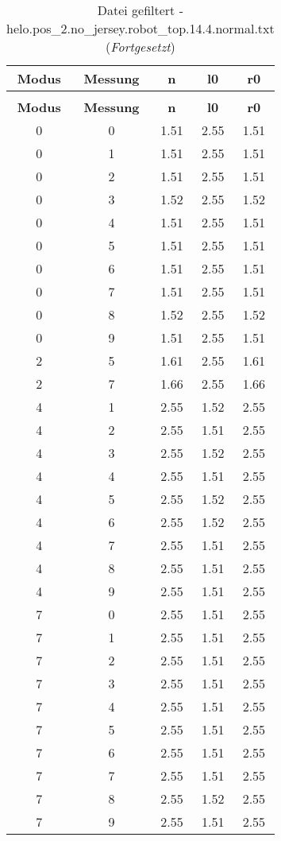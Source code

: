 \begin{longtable}{|c|c||c||c||c|}
	\caption{Datei gefiltert - helo.pos\_2.no\_jersey.robot\_top.14.4.normal.txt} \label{tab:helo.pos-2.no-jersey.robot-top.14.4.normal.txt} \\ \hline
	\textbf{Modus} & \textbf{Messung} & \textbf{n} & \textbf{l0} & \textbf{r0}\\ \hline
	\endfirsthead
	\caption[]{Datei gefiltert - helo.pos\_2.no\_jersey.robot\_top.14.4.normal.txt (\emph{Fortgesetzt})} \\ \hline
	\textbf{Modus} & \textbf{Messung} & \textbf{n} & \textbf{l0} & \textbf{r0}\\ \hline
	\endhead
	0 & 0 & 1.51 & 2.55 & 1.51 \\ \hline
	0 & 1 & 1.51 & 2.55 & 1.51 \\ \hline
	0 & 2 & 1.51 & 2.55 & 1.51 \\ \hline
	0 & 3 & 1.52 & 2.55 & 1.52 \\ \hline
	0 & 4 & 1.51 & 2.55 & 1.51 \\ \hline
	0 & 5 & 1.51 & 2.55 & 1.51 \\ \hline
	0 & 6 & 1.51 & 2.55 & 1.51 \\ \hline
	0 & 7 & 1.51 & 2.55 & 1.51 \\ \hline
	0 & 8 & 1.52 & 2.55 & 1.52 \\ \hline
	0 & 9 & 1.51 & 2.55 & 1.51 \\ \hline
	2 & 5 & 1.61 & 2.55 & 1.61 \\ \hline
	2 & 7 & 1.66 & 2.55 & 1.66 \\ \hline
	4 & 1 & 2.55 & 1.52 & 2.55 \\ \hline
	4 & 2 & 2.55 & 1.51 & 2.55 \\ \hline
	4 & 3 & 2.55 & 1.52 & 2.55 \\ \hline
	4 & 4 & 2.55 & 1.51 & 2.55 \\ \hline
	4 & 5 & 2.55 & 1.52 & 2.55 \\ \hline
	4 & 6 & 2.55 & 1.52 & 2.55 \\ \hline
	4 & 7 & 2.55 & 1.51 & 2.55 \\ \hline
	4 & 8 & 2.55 & 1.51 & 2.55 \\ \hline
	4 & 9 & 2.55 & 1.51 & 2.55 \\ \hline
	7 & 0 & 2.55 & 1.51 & 2.55 \\ \hline
	7 & 1 & 2.55 & 1.51 & 2.55 \\ \hline
	7 & 2 & 2.55 & 1.51 & 2.55 \\ \hline
	7 & 3 & 2.55 & 1.51 & 2.55 \\ \hline
	7 & 4 & 2.55 & 1.51 & 2.55 \\ \hline
	7 & 5 & 2.55 & 1.51 & 2.55 \\ \hline
	7 & 6 & 2.55 & 1.51 & 2.55 \\ \hline
	7 & 7 & 2.55 & 1.51 & 2.55 \\ \hline
	7 & 8 & 2.55 & 1.52 & 2.55 \\ \hline
	7 & 9 & 2.55 & 1.51 & 2.55 \\ \hline
\end{longtable}
